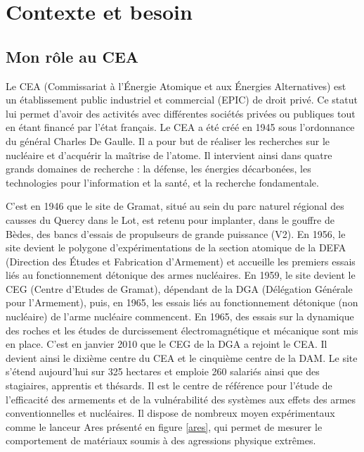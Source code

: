 \chapter{Contexte et besoin}
\section{Mon rôle au CEA}
Le CEA (Commissariat à l’Énergie Atomique et aux Énergies Alternatives) est un établissement public industriel et commercial (EPIC) de droit privé. Ce statut lui permet d’avoir des activités avec différentes sociétés privées ou publiques tout en étant financé par l’état français. Le CEA a été créé en 1945 sous l’ordonnance du général Charles De Gaulle. Il a pour but de réaliser les recherches sur le nucléaire et d’acquérir la maîtrise de l’atome. Il intervient ainsi dans quatre grands domaines de recherche : la défense, les énergies décarbonées, les technologies pour l’information et la santé, et la recherche fondamentale. 

C’est en 1946 que le site de Gramat, situé au sein du parc naturel régional des causses du Quercy dans le Lot, est retenu pour implanter, dans le gouffre de Bèdes, des bancs d’essais de propulseurs de grande puissance (V2). En 1956, le site devient le polygone d’expérimentations de la section atomique de la DEFA (Direction des Études et Fabrication d’Armement) et accueille les premiers essais liés au fonctionnement détonique des armes nucléaires. En 1959, le site devient le CEG (Centre d’Etudes de Gramat), dépendant de la DGA (Délégation Générale pour l’Armement), puis, en 1965, les essais liés au fonctionnement détonique (non nucléaire) de l’arme nucléaire commencent. En 1965, des essais sur la dynamique des roches et les études de durcissement électromagnétique et mécanique sont mis en place. C’est en janvier 2010 que le CEG de la DGA a rejoint le CEA. Il devient ainsi le dixième centre du CEA et le cinquième centre de la DAM. Le site s’étend aujourd’hui sur 325 hectares et emploie 260 salariés ainsi que des stagiaires, apprentis et thésards. Il est le centre de référence pour l’étude de l’efficacité des armements et de la vulnérabilité des systèmes aux effets des armes conventionnelles et nucléaires. Il dispose de nombreux moyen expérimentaux comme le lanceur Ares présenté en figure \ref{ares}, qui permet de mesurer le comportement de matériaux soumis à des agressions physique extrêmes.

